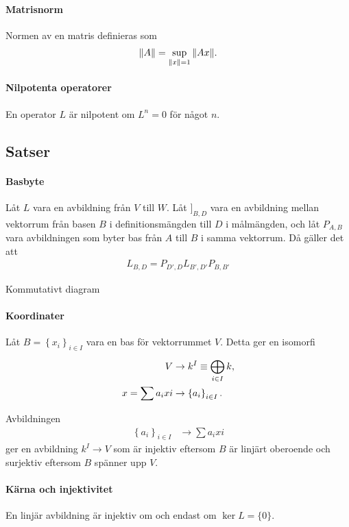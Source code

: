 \paragraph{Matrisnorm}
Normen av en matris definieras som
\begin{align*}
	\norm{A} = \sup\limits_{\norm{x} = 1}\norm{Ax}.
\end{align*}

\paragraph{Nilpotenta operatorer}
En operator $L$ är nilpotent om $L^{n} = 0$ för något $n$.

\subsection{Satser}

\paragraph{Basbyte}
Låt $L$ vara en avbildning från $V$ till $W$. Låt $]_{B, D}$ vara en avbildning mellan vektorrum från basen $B$ i definitionsmängden till $D$ i målmängden, och låt $P_{A, B}$ vara avbildningen som byter bas från $A$ till $B$ i samma vektorrum. Då gäller det att
\begin{align*}
	L_{B, D} = P_{D', D}L_{B', D'}P_{B, B'}
\end{align*}

\proof
Kommutativt diagram

\paragraph{Koordinater}
Låt $B = \left\{x_{i}\right\}_{i\in I}$ vara en bas för vektorrummet $V$. Detta ger en isomorfi
\begin{align*}
	V                  &\to k^{I}\equiv \bigoplus\limits_{i\in I}^{}k, \\
	x = \sum a_{i}x{i} &\to \left\{a_{i}\right\}_{i\in I}.
\end{align*}

\proof
Avbildningen
\begin{align*}
	\left\{a_{i}\right\}_{i\in I} &\to \sum a_{i}x{i}
\end{align*}
ger en avbildning $k^{I}\to V$ som är injektiv eftersom $B$ är linjärt oberoende och surjektiv eftersom $B$ spänner upp $V$.

\paragraph{Kärna och injektivitet}
En linjär avbildning är injektiv om och endast om $\ker{L} = \{0\}$.

